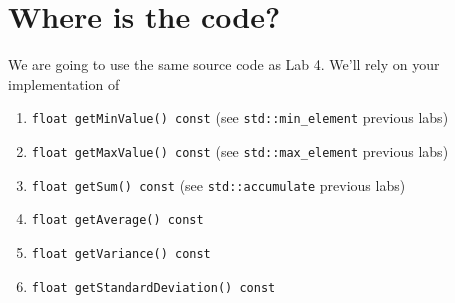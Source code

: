 \documentclass[english,a4paper,12pt,oneside]{article}
\begin{document}
\section{Where is the code?}

We are going to use the same source code as Lab 4. 
We'll rely on your implementation of 



% 
\begin{enumerate}
 \item \verb+float getMinValue() const+ (see \verb+std::min_element+ previous labs)
 \item \verb+float getMaxValue() const+ (see \verb+std::max_element+ previous labs)
 \item \verb+float getSum() const+ (see \verb+std::accumulate+ previous labs)
 \item \verb+float getAverage() const+
 \item \verb+float getVariance() const+
 \item \verb+float getStandardDeviation() const+
\end{enumerate}
\end{document}
